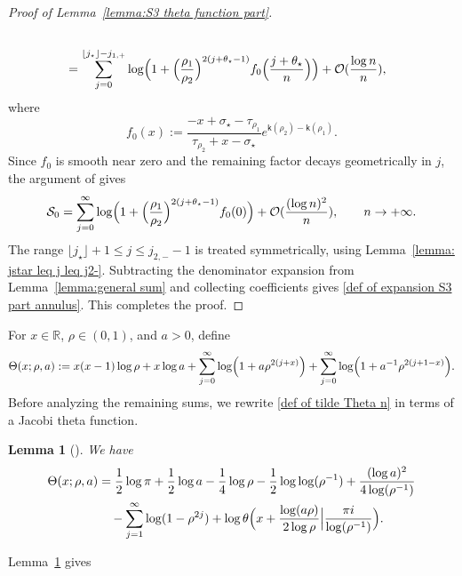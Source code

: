 \documentclass[a4paper]{article}
\newtheorem{lemma}[theorem]{Lemma}
\newcommand{\R}{\mathbb{R}}
\numberwithin{equation}{section}
\begin{document}
\begin{proof}[Proof of Lemma~\ref{lemma:S3 theta function part}]
\begin{align}
\begin{split}
\\
&=
\sum_{j=0}^{\lfloor j_{\star}\rfloor-j_{1,+}}\log\Bigl(1+\Bigl(\frac{\rho_1}{\rho_2}\Bigr)^{2(j+\theta_{\star}-1)}f_0\Bigl(\frac{j+\theta_\star}{n}\Bigr)\Bigr)
+\mathcal{O}(\frac{\log n}{n}),
\end{split}    
\end{align}
where 
\[
f_0(x):=\frac{-x+\sigma_{\star}-\tau_{\rho_1}}{\tau_{\rho_2}+x-\sigma_{\star}}e^{\mathsf{k}(\rho_2)-\mathsf{k}(\rho_1)}.
\]
Since $f_0$ is smooth near zero and the remaining factor decays geometrically in $j$, the argument of \cite[Lemma~3.6]{C2021} gives
\begin{equation}
\mathcal{S}_0=\sum_{j=0}^{\infty}\log\Bigl(1+\Bigl(\frac{\rho_1}{\rho_2}\Bigr)^{2(j+\theta_{\star}-1)}f_0(0)\Bigr)
+\mathcal{O}(\frac{(\log n)^2}{n}),\qquad n\to+\infty.  
\end{equation}
The range $\lfloor j_\star\rfloor+1\leq j\leq j_{2,-}-1$ is treated symmetrically, using Lemma~\ref{lemma: jstar leq j leq j2-}. Subtracting the denominator expansion from Lemma~\ref{lemma:general sum} and collecting coefficients gives \eqref{def of expansion S3 part annulus}.
This completes the proof. 
\end{proof}
For $x\in\R$, $\rho\in(0,1)$, and $a>0$, define 
\[
\Theta(x;\rho,a)
:=x(x-1)\log\rho+x\log a
+\sum_{j=0}^{\infty}\log\Bigl(1+a\rho^{2(j+x)}\Bigr)
+\sum_{j=0}^{\infty}\log\Bigl(1+a^{-1}\rho^{2(j+1-x)}\Bigr). 
\]
Before analyzing the remaining sums, we rewrite \eqref{def of tilde Theta n} in terms of a Jacobi theta function.
\begin{lemma}[{\cite[Lemma~3.28]{C2021}}]
\label{lemma: lemma tilde Theta to Theta}
We have 
\begin{align*}
\Theta(x;\rho,a)
&=\frac{1}{2}\log\pi+\frac{1}{2}\log a-\frac{1}{4}\log\rho-\frac{1}{2}\log\log(\rho^{-1})
+\frac{(\log a)^2}{4\log(\rho^{-1})}
\\
&\quad
-\sum_{j=1}^{\infty}\log(1-\rho^{2j})+\log\theta\Bigl(x+\frac{\log (a\rho)}{2\log\rho}\Bigr|\frac{\pi i}{\log(\rho^{-1})}\Bigr). 
\end{align*}
\end{lemma}
Lemma~\ref{lemma: lemma tilde Theta to Theta} gives
\end{document}
